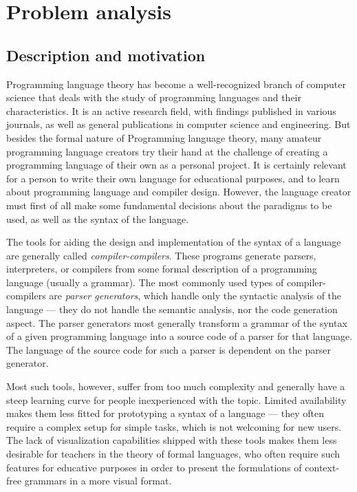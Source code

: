 \documentclass[english,bachelors,forcepolishlogotype]{wizthesis}
\begin{document}
\chapter{Problem analysis} \label{ch:problem-analysis}

\section{Description and motivation} \label{sec:description-and-motivation}

Programming language theory has become a well-recognized branch of computer
science that deals with the study of programming languages and their
characteristics. It is an active research field, with findings published in
various journals, as well as general publications in computer science and
engineering. But besides the formal nature of Programming language theory, many
amateur programming language creators try their hand at the challenge of
creating a programming language of their own as a personal project. It is
certainly relevant for a person to write their own language for educational
purposes, and to learn about programming language and compiler design. However,
the language creator must first of all make some fundamental decisions about the
paradigms to be used, as well as the syntax of the language.

The tools for aiding the design and implementation of the syntax of a language
are generally called \emph{compiler-compilers}. These programs generate parsers,
interpreters, or compilers from some formal description of a programming
language (usually a grammar). The most commonly used types of compiler-compilers
are \emph{parser generators}, which handle only the syntactic analysis of the
language --- they do not handle the semantic analysis, nor the code generation
aspect. The parser generators most generally transform a grammar of the syntax
of a given programming language into a source code of a parser for that
language. The language of the source code for such a parser is dependent on the
parser generator.

Most such tools, however, suffer from too much complexity and generally have a
steep learning curve for people inexperienced with the topic. Limited
availability makes them less fitted for prototyping a syntax of a language ---
they often require a complex setup for simple tasks, which is not welcoming for
new users. The lack of visualization capabilities shipped with these tools makes
them less desirable for teachers in the theory of formal languages, who often
require such features for educative purposes in order to present the
formulations of context-free grammars in a more visual format.
\end{document}
